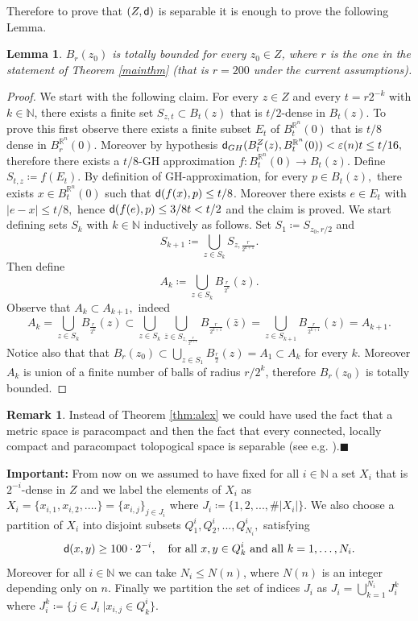 \documentclass[11pt]{article}
\newcommand{\eps}{\varepsilon}
\newcommand{\rr}{\mathbb{R}}
\newcommand{\nn}{\mathbb{N}}
\newcommand{\sfd}{{\sf d}}
\newcommand{\fr}{\penalty-20\null\hfill$\blacksquare$}
\theoremstyle{plain}
\newtheorem{lemma}[theorem]{Lemma}
\theoremstyle{definition}
\newtheorem{remark}[theorem]{Remark}
\numberwithin{equation}{section}
\begin{document}
Therefore to prove that $(Z,\sfd)$ is separable it is enough  to prove the following Lemma.
\begin{lemma}\label{totballs}
	$B_{r}(z_0)$ is totally bounded for every $z_0 \in Z$, where $r$ is the one in the statement of Theorem \ref{mainthm} (that is $r=200$  under the current assumptions).
\end{lemma}
\begin{proof}
	We start with the following claim. For every $z\in Z$ and every $t=r2^{-k}$ with $k\in \mathbb{N}$, there exists a finite set $S_{z,t} \subset B_{t}(z)$ that is $t/2$-dense in $B_{t}(z).$ To prove this first observe there exists a finite subset $E_t$ of $B^{\rr^n}_{t}(0)$ that is $t/8$ dense in $B^{\rr^n}_{r}(0)$. Moreover by hypothesis 	
	$\sfd_{GH}(B^Z_{t}(z),B^{\rr^n}_{t}(0))<\eps(n)t\le t/16,$ therefore there exists a $t/8$-GH approximation $f: B^{\rr^n}_{t}(0) \to B_t(z).$ Define $S_{t,z}\coloneqq f(E_t).$ By definition of GH-approximation, for  every $p \in B_t(z),$ there exists $x \in B^{\rr^n}_{t}(0) $ such that $\sfd(f(x),p)\le t/8$. Moreover there exists $e \in E_t$ with $|e-x|\le t/8,$ hence $\sfd(f(e),p) \le 3/8t<t/2$ and the claim is proved. We start defining sets $S_k$ with $k\in \mathbb{N}$ inductively as follows. Set $S_1\coloneqq S_{z_0,r/2}$ and $$S_{k+1}\coloneqq\bigcup_{z \in S_k} S_{z,\frac{r}{2^{k+1}}}.$$
	Then define 
	$$A_k\coloneqq \bigcup_{z\in S_k} B_{\frac{r}{2^k}}(z).$$
	Observe that $A_k \subset A_{k+1},$ indeed 
	$$A_k=\bigcup_{z\in S_k} B_{\frac{r}{2^k}}(z)\subset \bigcup_{z\in S_k} \bigcup_{\bar z \in S_{z,\frac{r}{2^{k+1}}}} B_{\frac{r}{2^{k+1}}}(\bar z)=\bigcup_{z\in S_{k+1}} B_{\frac{r}{2^{k+1}}}(z)=A_{k+1}.$$
	Notice also that that $B_{r}(z_0)\subset \bigcup_{z\in S_1} B_{\frac{r}{2}}(z)=A_1 \subset A_k$ for every $k$. Moreover $A_k$ is union of a finite number of balls of radius $r/2^{k}$, therefore $B_{r}(z_0)$ is totally bounded.
\end{proof}
\begin{remark}
	Instead of Theorem \ref{thm:alex} we could have used the fact that a metric space is paracompact and then the fact that every connected, locally compact and paracompact tolopogical space is separable (see e.g. \cite[Appendix A]{spivak}).\fr
\end{remark}


\begin{tcolorbox}[colframe=white,colback=mygray]
  \textbf{Important:} From now on we assumed to have fixed for all $i\in \nn$ a set $X_i$ that is $2^{-i}$-dense in $Z$ and we label the elements of $X_i$ as $X_i=\{x_{i,1},x_{i,2},....\}=\{x_{i,j}\}_{j\in J_i}$ where $J_i\coloneqq \{1,2,...,\#|X_i|\}$.
We also choose a partition of $X_i$ into disjoint subsets $Q^i_1,Q^i_2,...,Q^i_{N_i},$ satisfying 
\[
\sfd(x,y)\ge100 \cdot 2^{-i}, \quad \text{for all $x,y \in Q^i_k$ and all $k=1,\dots,N_i$}.
\]
Moreover for all $i\in \nn$ we can take $N_i\le N(n)$, where $N(n)$ is an integer depending only on $n$.
 Finally we partition  the set of indices $J_i$ as $J_i=\bigcup_{k=1}^{N_i}J_i^k$ where $J_i^k\coloneqq  \{ j\in J_i \ | x_{i,j}\in Q_k^i\}$.
\end{tcolorbox}
\end{document}
